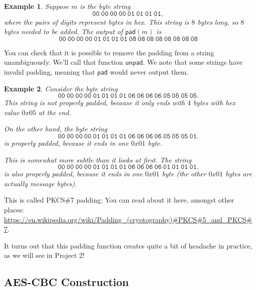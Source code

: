 \documentclass[11pt]{article}
\newtheorem{example}{Example}
\newcommand{\pad}{\mathsf{pad}}
\newcommand{\unpad}{\mathsf{unpad}}
\begin{document}
\begin{example}
    Suppose $m$ is the byte string 
    \[
        \mathtt{00\ 00\ 00\ 00\ 01\ 01\ 01\ 01},
    \]
    where the pairs of digits represent bytes in hex.
    This string is $8$ bytes long, so $8$ bytes needed to be added.
    The output of $\pad(m)$ is
    \[
        \mathtt{00\ 00\ 00\ 00\ 01\ 01\ 01\ 01\ 08\ 08\ 08\ 08\ 08\ 08\ 08\ 08}
    \]
\end{example}
You can check that it is possible to remove the padding from a string
unambiguously. We'll call that function $\unpad$. We note that some strings
have invalid padding, meaning that $\pad$ would never output them.
\begin{example}
    Consider the byte string
    \[
        \mathtt{00\ 00\ 00\ 00\ 01\ 01\ 01\ 01\ 06\ 06\ 06\ 06\ 05\ 05\ 05\ 05}.
    \]
    This string is not properly padded, because it only ends with $4$ bytes
    with hex value $0x05$ at the end.

    On the other hand, the byte string
    \[
        \mathtt{00\ 00\ 00\ 00\ 01\ 01\ 01\ 01\ 06\ 06\ 06\ 06\ 05\ 05\ 05\ 01}.
    \]
    \emph{is} properly padded, because it ends in one $0x01$ byte.

    This is somewhat more subtle than it looks at first. The string
    \[
        \mathtt{00\ 00\ 00\ 00\ 01\ 01\ 01\ 01\ 06\ 06\ 06\ 06\ 01\ 01\ 01\ 01}.
    \]
    is also properly padded, because it ends in one $0x01$ byte (the other
    $0x01$ bytes are actually message bytes).
\end{example}
This is called PKCS\#7 padding; You can read about it here, amongst other
places:
\url{https://en.wikipedia.org/wiki/Padding_(cryptography)#PKCS#5_and_PKCS#7}.

It turns out that this padding function creates quite a bit of headache in
practice, as we will see in Project 2!

\subsection{AES-CBC Construction}
\end{document}

